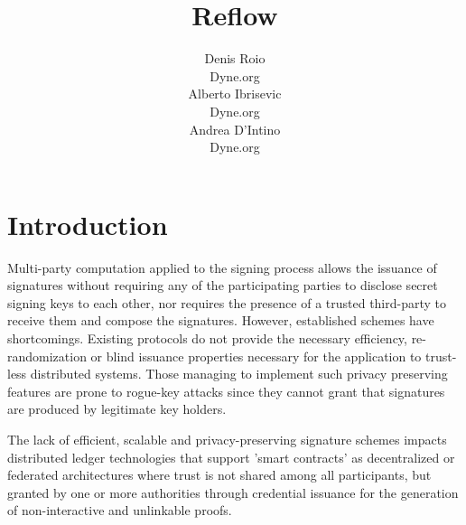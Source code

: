 \documentclass[twocolumn]{article}
\title{Reflow}
\author{
  Denis Roio \\
	Dyne.org \\
    \And
	Alberto Ibrisevic \\
  Dyne.org \\
    \And
  Andrea D'Intino \\
  Dyne.org
}
\begin{document}

\section{Introduction}

Multi-party computation applied to the signing process allows the
issuance of signatures without requiring any of the participating
parties to disclose secret signing keys to each other, nor requires the
presence of a trusted third-party to receive them and compose the
signatures. However, established schemes have shortcomings. Existing
protocols do not provide the necessary efficiency, re-randomization or
blind issuance properties necessary for the application to trust-less
distributed systems. Those managing to implement such privacy preserving
features are prone to rogue-key attacks \citep{ietf-bls} since they
cannot grant that signatures are produced by legitimate key holders.

The lack of efficient, scalable and privacy-preserving signature schemes
impacts distributed ledger technologies that support 'smart contracts'
as decentralized or federated architectures where trust is not shared
among all participants, but granted by one or more authorities through
credential issuance for the generation of non-interactive and unlinkable
proofs.
\end{document}
